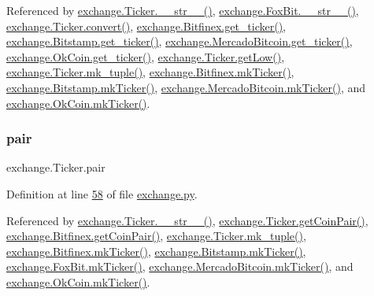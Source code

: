 Referenced by \hyperlink{exchange_8py_source_l00136}{exchange.\+Ticker.\+\_\+\+\_\+str\+\_\+\+\_\+()}, \hyperlink{exchange_8py_source_l00610}{exchange.\+Fox\+Bit.\+\_\+\+\_\+str\+\_\+\+\_\+()}, \hyperlink{exchange_8py_source_l00069}{exchange.\+Ticker.\+convert()}, \hyperlink{exchange_8py_source_l00439}{exchange.\+Bitfinex.\+get\+\_\+ticker()}, \hyperlink{exchange_8py_source_l00511}{exchange.\+Bitstamp.\+get\+\_\+ticker()}, \hyperlink{exchange_8py_source_l00651}{exchange.\+Mercado\+Bitcoin.\+get\+\_\+ticker()}, \hyperlink{exchange_8py_source_l00716}{exchange.\+Ok\+Coin.\+get\+\_\+ticker()}, \hyperlink{exchange_8py_source_l00109}{exchange.\+Ticker.\+get\+Low()}, \hyperlink{exchange_8py_source_l00121}{exchange.\+Ticker.\+mk\+\_\+tuple()}, \hyperlink{exchange_8py_source_l00453}{exchange.\+Bitfinex.\+mk\+Ticker()}, \hyperlink{exchange_8py_source_l00525}{exchange.\+Bitstamp.\+mk\+Ticker()}, \hyperlink{exchange_8py_source_l00665}{exchange.\+Mercado\+Bitcoin.\+mk\+Ticker()}, and \hyperlink{exchange_8py_source_l00730}{exchange.\+Ok\+Coin.\+mk\+Ticker()}.

\mbox{\label{classexchange_1_1_ticker_a382f9199d13a7b5929a26065fad4e491}} 
\subsubsection{\texorpdfstring{pair}{pair}}
{\footnotesize\ttfamily exchange.\+Ticker.\+pair}



Definition at line \hyperlink{exchange_8py_source_l00058}{58} of file \hyperlink{exchange_8py_source}{exchange.\+py}.



Referenced by \hyperlink{exchange_8py_source_l00136}{exchange.\+Ticker.\+\_\+\+\_\+str\+\_\+\+\_\+()}, \hyperlink{exchange_8py_source_l00094}{exchange.\+Ticker.\+get\+Coin\+Pair()}, \hyperlink{exchange_8py_source_l00479}{exchange.\+Bitfinex.\+get\+Coin\+Pair()}, \hyperlink{exchange_8py_source_l00121}{exchange.\+Ticker.\+mk\+\_\+tuple()}, \hyperlink{exchange_8py_source_l00453}{exchange.\+Bitfinex.\+mk\+Ticker()}, \hyperlink{exchange_8py_source_l00525}{exchange.\+Bitstamp.\+mk\+Ticker()}, \hyperlink{exchange_8py_source_l00584}{exchange.\+Fox\+Bit.\+mk\+Ticker()}, \hyperlink{exchange_8py_source_l00665}{exchange.\+Mercado\+Bitcoin.\+mk\+Ticker()}, and \hyperlink{exchange_8py_source_l00730}{exchange.\+Ok\+Coin.\+mk\+Ticker()}.

